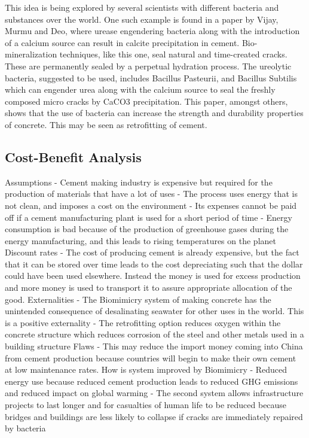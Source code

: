 This idea is being explored by several scientists with different bacteria and substances over the world. One such example is found in a paper by Vijay, Murmu and Deo,  where urease engendering bacteria along with the introduction of a calcium source can result in calcite precipitation in cement. Bio-mineralization techniques, like this one, seal natural and time-created cracks. These are permanently sealed by a perpetual hydration process. The ureolytic bacteria, suggested to be used, includes Bacillus Pasteurii, and Bacillus Subtilis which can engender urea along with the calcium source to seal the freshly composed micro cracks by CaCO3 precipitation. This paper, amongst others, shows that the use of bacteria can increase the strength and durability properties of concrete. This may be seen as retrofitting of cement.

\subsection{Cost-Benefit Analysis}

Assumptions
-	Cement making industry is expensive but required for the production of materials that have a lot of uses
-	The process uses energy that is not clean, and imposes a cost on the environment
-	Its expenses cannot be paid off if a cement manufacturing plant is used for a short period of time
-	Energy consumption is bad because of the production of greenhouse gases during the energy manufacturing, and this leads to rising temperatures on the planet
Discount rates
-	The cost of producing cement is already expensive, but the fact that it can be stored over time leads to the cost depreciating such that the dollar could have been used elsewhere. Instead the money is used for excess production and more money is used to transport it to assure appropriate allocation of the good.
Externalities
-	The Biomimicry system of making concrete has the unintended consequence of desalinating seawater for other uses in the world. This is a positive externality
-	The retrofitting option reduces oxygen within the concrete structure which reduces corrosion of the steel and other metals used in a building structure
Flaws
-	This may reduce the import money coming into China from cement production because countries will begin to make their own cement at low maintenance rates.
How is system improved by Biomimicry
-	Reduced energy use because reduced cement production leads to reduced GHG emissions and reduced impact on global warming
-	The second system allows infrastructure projects to last longer and for casualties of human life to be reduced because bridges and buildings are less likely to collapse if cracks are immediately repaired by bacteria

